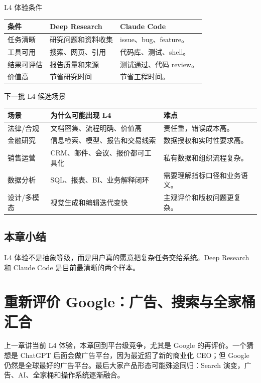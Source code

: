 \documentclass[a4paper]{article}
\begin{document}
\begin{knowledgebox}{L4 体验条件}
\begin{tabularx}{\textwidth}{p{}p{}X}
\toprule
条件 & Deep Research & Claude Code \\
\midrule
任务清晰 & 研究问题和资料收集 & issue、bug、feature。 \\
工具可用 & 搜索、网页、引用 & 代码库、测试、shell。 \\
结果可评估 & 报告质量和来源 & 测试通过、代码 review。 \\
价值高 & 节省研究时间 & 节省工程时间。 \\
\bottomrule
\end{tabularx}
\end{knowledgebox}

\begin{knowledgebox}{下一批 L4 候选场景}
\begin{tabularx}{\textwidth}{p{}p{}X}
\toprule
场景 & 为什么可能出现 L4 & 难点 \\
\midrule
法律/合规 & 文档密集、流程明确、价值高 & 责任重，错误成本高。 \\
金融研究 & 信息检索、模型、报告和交易线索 & 数据授权和实时性要求高。 \\
销售运营 & CRM、邮件、会议、报价都可工具化 & 私有数据和组织流程复杂。 \\
数据分析 & SQL、报表、BI、业务解释闭环 & 需要理解指标口径和业务语义。 \\
设计/多模态 & 视觉生成和编辑迭代变快 & 主观评价和版权问题更复杂。 \\
\bottomrule
\end{tabularx}
\end{knowledgebox}

\subsection{本章小结}

L4 体验不是抽象等级，而是用户真的愿意把复杂任务交给系统。Deep Research 和 Claude Code 是目前最清晰的两个样本。

\section{重新评价 Google：广告、搜索与全家桶汇合}

上一章讲当前 L4 体验，本章回到平台级竞争，尤其是 Google 的再评价。一个猜想是 ChatGPT 后面会做广告平台，因为最近招了新的商业化 CEO；但 Google 仍然是全球最好的广告平台。最后大家产品形态可能殊途同归：Search 演变，广告、AI、全家桶和操作系统逐渐融合。
\end{document}
